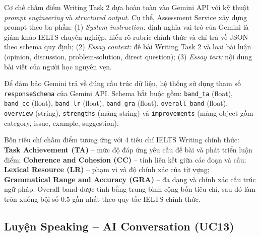 \documentclass[a4paper,12pt]{extreport}
\begin{document}
Cơ chế chấm điểm Writing Task 2 dựa hoàn toàn vào Gemini API với kỹ thuật \textit{prompt engineering} và \textit{structured output}. Cụ thể, Assessment Service xây dựng prompt theo ba phần: (1) \textit{System instruction:} định nghĩa vai trò của Gemini là giám khảo IELTS chuyên nghiệp, hiểu rõ rubric chính thức và chỉ trả về JSON theo schema quy định; (2) \textit{Essay context:} đề bài Writing Task 2 và loại bài luận (opinion, discussion, problem-solution, direct question); (3) \textit{Essay text:} nội dung bài viết của người học nguyên vẹn.

Để đảm bảo Gemini trả về đúng cấu trúc dữ liệu, hệ thống sử dụng tham số \texttt{responseSchema} của Gemini API. Schema bắt buộc gồm: \texttt{band\_ta} (float), \texttt{band\_cc} (float), \texttt{band\_lr} (float), \texttt{band\_gra} (float), \texttt{overall\_band} (float), \texttt{overview} (string), \texttt{strengths} (mảng string) và \texttt{improvements} (mảng object gồm category, issue, example, suggestion).

Bốn tiêu chí chấm điểm tương ứng với 4 tiêu chí IELTS Writing chính thức: \textbf{Task Achievement (TA)} -- mức độ đáp ứng yêu cầu đề bài và phát triển luận điểm; \textbf{Coherence and Cohesion (CC)} -- tính liên kết giữa các đoạn và câu; \textbf{Lexical Resource (LR)} -- phạm vi và độ chính xác của từ vựng; \textbf{Grammatical Range and Accuracy (GRA)} -- đa dạng và chính xác cấu trúc ngữ pháp. Overall band được tính bằng trung bình cộng bốn tiêu chí, sau đó làm tròn xuống bội số 0.5 gần nhất theo quy tắc IELTS chính thức.

\subsection{Luyện Speaking -- AI Conversation (UC13)}
\end{document}
